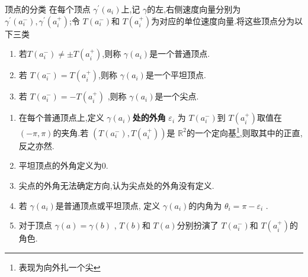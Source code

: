 \documentclass[../../main.tex]{subfiles}
\begin{document}
\begin{definition}{顶点的分类}
    在每个顶点 \(   \gamma ^{\prime} \left( a_{i} \right)   \)上,记 \(   \gamma   \)的左,右侧速度向量分别为 \(   \gamma ^{\prime} \left( a_{i}^{-} \right), \gamma ^{\prime} \left( a_{i}^{+ } \right)    \);令 \(  T\left( a_{i}^{-} \right)   \)和 \(  T\left( a_{i}^{+ } \right)   \)为对应的单位速度向量.将这些顶点分为以下三类
    \begin{enumerate}
        \item 若\(  T\left( a_{i}^{-} \right)\neq \pm T\left( a_{i}^{+ } \right)    \),则称 \(   \gamma \left( a_{i} \right)   \)是一个普通顶点.
        \item 若 \(  T\left( a_{i}^{-} \right)= T\left( a_{i}^{+ } \right)    \),则称 \(   \gamma \left( a_{i} \right)   \)是一个平坦顶点.    
        \item 若 \(  T\left( a_{i}^{-} \right)= -T\left( a_{i} ^{+ }\right)    \) ,则称 \(   \gamma \left( a_{i} \right)   \)是一个尖点. 
    \end{enumerate}
         
\end{definition}

\begin{definition}
   \begin{enumerate}
    \item  在每个普通顶点上,定义 \textbf{\(   \gamma \left( a_{i} \right)   \)处的外角 } \(   \varepsilon _{i}  \) 为 \(  T\left( a_{i}^{-} \right)   \)到 \(  T\left( a_{i}^{+ } \right)   \)取值在 \(  \left( -\pi  ,\pi \right)   \)的夹角.若 \(  \left( T\left( a_{i}^{-} \right),T\left( a_{i}^{+ } \right)   \right)   \)是 \(  \mathbb{R} ^{2}  \)的一个定向基\footnote{表现为向外扎一个尖},则取其中的正直,反之亦然.
    \item 平坦顶点的外角定义为0.
    \item 尖点的外角无法确定方向,认为尖点处的外角没有定义.
    \item 若 \(   \gamma \left( a_{i} \right)   \)是普通顶点或平坦顶点, 定义 \(   \gamma \left( a_{i} \right)   \)的内角为 \(   \theta _{i}= \pi - \varepsilon _{i}  \) .
    \item 对于顶点 \(   \gamma \left( a \right)=  \gamma \left( b \right)    \) , \(  T\left( b \right)   \)和 \(  T\left( a \right)   \)分别扮演了 \(  T\left( a_{i}^{-} \right)   \)和 \(  T\left( a_{i}^{+ } \right)   \)的角色.    
   \end{enumerate}
   
\end{definition}
\end{document}
